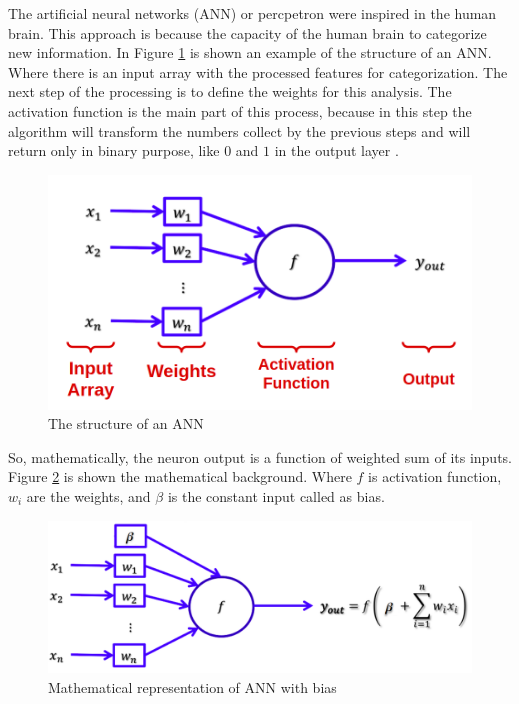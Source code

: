 The artificial neural networks (ANN) or percpetron were inspired in the human brain. This approach is because the capacity of the human brain to categorize new information. In Figure \ref{fig:ann} is shown an example of the structure of an ANN. Where there is an input array with the processed features for categorization. The next step of the processing is to define the weights for this analysis. The activation function is the main part of this process, because in this step the algorithm will transform the numbers collect by the previous steps and will return only in binary purpose, like $0$ and $1$ in the output layer \cite{goodfellow2016deep}.

\begin{figure}[H]
\centering
\includegraphics[width=\columnwidth]{imagens/ann.png}
\caption{The structure of an ANN}
\label{fig:ann}
\end{figure}

So, mathematically, the neuron output is a function of weighted sum of its inputs. Figure \ref{fig:ann_weight} is shown the mathematical background. Where $f$ is activation function, $w_i$ are the weights, and $\beta$ is the constant input called as bias.


\begin{figure}[H]
\centering
\includegraphics[width=\columnwidth]{imagens/math_ann_bias.png}
\caption{Mathematical representation of ANN with bias}
\label{fig:ann_weight}
\end{figure}



